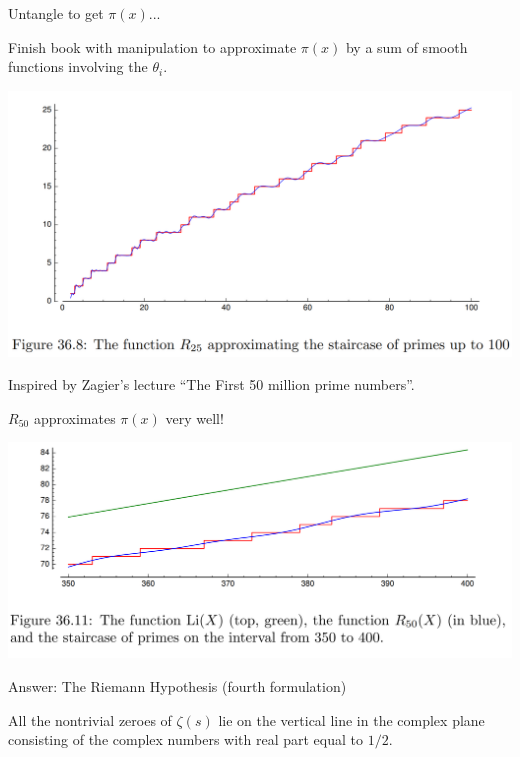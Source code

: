 \documentclass{beamer}
\begin{document}
\begin{frame}{Untangle to get $\pi(x)$...}


Finish book with manipulation to approximate $\pi(x)$ 
by a sum of smooth functions involving the $\theta_i$.
\vfill 

\includegraphics[height=.65\textheight]{pics/R25-approx}

\vfill
Inspired by Zagier's lecture ``The First 50 million prime numbers''.
\end{frame}


\begin{frame}{$R_{50}$ approximates $\pi(x)$ very well!}

\includegraphics[height=.55\textheight]{pics/Li-R50-pi}

\end{frame}



\begin{frame}{Answer: The Riemann Hypothesis (fourth formulation)}
  \begin{block}{}
    All the nontrivial zeroes of $\zeta(s)$ lie on the vertical
    line in the complex plane consisting of the
    complex numbers with real part equal to $1/2$.
  \end{block}
\end{frame}
\end{document}
